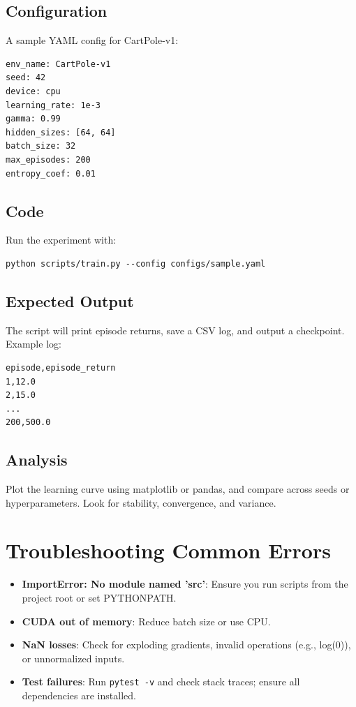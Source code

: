 \documentclass[11pt]{article}
\begin{document}
\subsection{Configuration}
A sample YAML config for CartPole-v1:
\begin{verbatim}
env_name: CartPole-v1
seed: 42
device: cpu
learning_rate: 1e-3
gamma: 0.99
hidden_sizes: [64, 64]
batch_size: 32
max_episodes: 200
entropy_coef: 0.01
\end{verbatim}

\subsection{Code}
Run the experiment with:
\begin{verbatim}
python scripts/train.py --config configs/sample.yaml
\end{verbatim}

\subsection{Expected Output}
The script will print episode returns, save a CSV log, and output a checkpoint. Example log:
\begin{verbatim}
episode,episode_return
1,12.0
2,15.0
...
200,500.0
\end{verbatim}

\subsection{Analysis}
Plot the learning curve using matplotlib or pandas, and compare across seeds or hyperparameters. Look for stability, convergence, and variance.

\section{Troubleshooting Common Errors}
\begin{itemize}
  \item \textbf{ImportError: No module named 'src'}: Ensure you run scripts from the project root or set PYTHONPATH.
  \item \textbf{CUDA out of memory}: Reduce batch size or use CPU.
  \item \textbf{NaN losses}: Check for exploding gradients, invalid operations (e.g., log(0)), or unnormalized inputs.
  \item \textbf{Test failures}: Run \texttt{pytest -v} and check stack traces; ensure all dependencies are installed.
\end{itemize}
\end{document}

